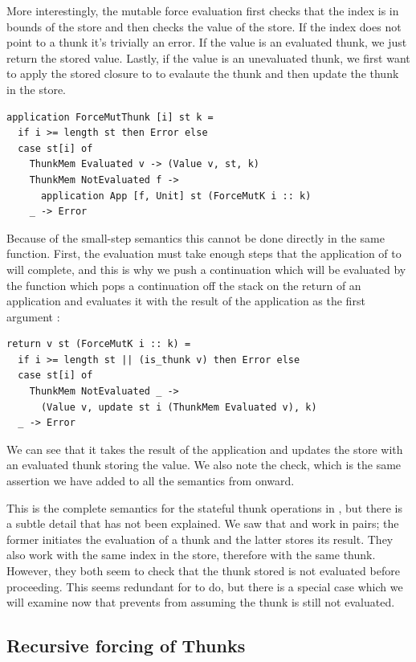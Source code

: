 More interestingly, the mutable force evaluation first checks that the index is
in bounds of the store and then checks the value of the store. If the index does
not point to a thunk it's trivially an error. If the value is an evaluated
thunk, we just return the stored value. Lastly, if the value is an unevaluated
thunk, we first want to apply the stored closure to  to evalaute the
thunk and then update the thunk in the store.
\begin{verbatim}
application ForceMutThunk [i] st k =
  if i >= length st then Error else
  case st[i] of
    ThunkMem Evaluated v -> (Value v, st, k)
    ThunkMem NotEvaluated f ->
      application App [f, Unit] st (ForceMutK i :: k)
    _ -> Error
\end{verbatim}
Because of the small-step semantics this cannot be done directly in the same
function. First, the evaluation must take enough steps that the application of
 to  will complete, and this is why we push a
 continuation which will be evaluated by the 
function which pops a continuation off the stack on the return of an application
and evaluates it with the result of the application as the first argument
:
\begin{verbatim}
return v st (ForceMutK i :: k) =
  if i >= length st || (is_thunk v) then Error else
  case st[i] of
    ThunkMem NotEvaluated _ ->
      (Value v, update st i (ThunkMem Evaluated v), k)
  _ -> Error
\end{verbatim}
We can see that it takes the result of the application and updates the
store with an evaluated thunk storing the value. We also note the
 check, which is the same assertion we have added to all the
 semantics from \ThunkLang{} onward.

This is the complete semantics for the stateful thunk operations in
\StateLang{}, but there is a subtle detail that has not been explained. We saw
that  and  work in pairs; the former
initiates the evaluation of a thunk and the latter stores its result. They also
work with the same index in the store, therefore with the same thunk. However,
they both seem to check that the thunk stored is not evaluated before
proceeding. This seems redundant for  to do, but there is a
special case which we will examine now that prevents  from
assuming the thunk is still not evaluated.

\subsection{Recursive forcing of Thunks}

